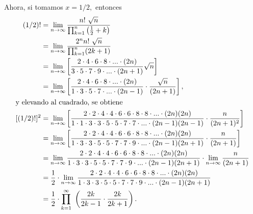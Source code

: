 Ahora, si tomamos $x = 1/2,$ entonces
\begin{align*}
(1/2)! &= \lim_{n \rightarrow \infty}\frac{n!\ \sqrt{n}}{\prod_{k = 1}^{n}\left(\frac{1}{2}+k\right)} \\
&= \lim_{n \rightarrow \infty}\frac{2^n n!\ \sqrt{n}}{\prod_{k = 1}^{n}(2k+1)} \\
&= \lim_{n \rightarrow \infty} \left[\frac{2 \cdot 4 \cdot 6 \cdot 8 \cdot ... \cdot (2n)}{3 \cdot 5 \cdot 7 \cdot 9 \cdot ... \cdot (2n+1)} \sqrt{n}\right] \\
&= \lim_{n \rightarrow \infty}\left[\frac{2 \cdot 4 \cdot 6 \cdot 8 \cdot ... \cdot (2n)}{1 \cdot 3 \cdot 5 \cdot 7 \cdot ... \cdot (2n-1)}\cdot \frac{\sqrt{n}}{(2n+1)}\right], \\
\intertext{y elevando al cuadrado, se obtiene}
[(1/2)!]^2 &= \lim_{n \rightarrow \infty} \left[\frac{2 \cdot 2 \cdot 4 \cdot 4 \cdot 6 \cdot 6 \cdot 8 \cdot 8 \cdot ... \cdot (2n)(2n)}{1 \cdot 1 \cdot 3 \cdot 3 \cdot 5 \cdot 5 \cdot 7 \cdot 7 \cdot ... \cdot (2n-1)(2n-1)}\cdot \frac{n}{(2n+1)^2}\right]  \\
&= \lim_{n \rightarrow \infty} \left[\frac{2 \cdot 2 \cdot 4 \cdot 4 \cdot 6 \cdot 6 \cdot 8 \cdot 8 \cdot ... \cdot (2n)(2n)}{1 \cdot 3 \cdot 3 \cdot 5 \cdot 5 \cdot 7 \cdot 7 \cdot 9 \cdot ... \cdot (2n-1)(2n+1)}\cdot \frac{n}{(2n+1)}\right]  \\
&= \lim_{n \rightarrow \infty} \frac{2 \cdot 2 \cdot 4 \cdot 4 \cdot 6 \cdot 6 \cdot 8 \cdot 8 \cdot ... \cdot (2n)(2n)}{1 \cdot 3 \cdot 3 \cdot 5 \cdot 5 \cdot 7 \cdot 7 \cdot 9 \cdot ... \cdot (2n-1)(2n+1)}\cdot \lim_{n \rightarrow \infty} \frac{n}{(2n+1)} \\
&= \frac{1}{2}\cdot \lim_{n \rightarrow \infty} \frac{2 \cdot 2 \cdot 4 \cdot 4 \cdot 6 \cdot 6 \cdot 8 \cdot 8 \cdot ... \cdot (2n)(2n)}{1 \cdot 3 \cdot 3 \cdot 5 \cdot 5 \cdot 7 \cdot 7 \cdot 9 \cdot ... \cdot (2n-1)(2n+1)} \\
&= \frac{1}{2}\cdot \prod_{k = 1}^{\infty}\ \left(\frac{2k}{2k-1}\cdot\frac{2k}{2k+1}\right).
\end{align*}

